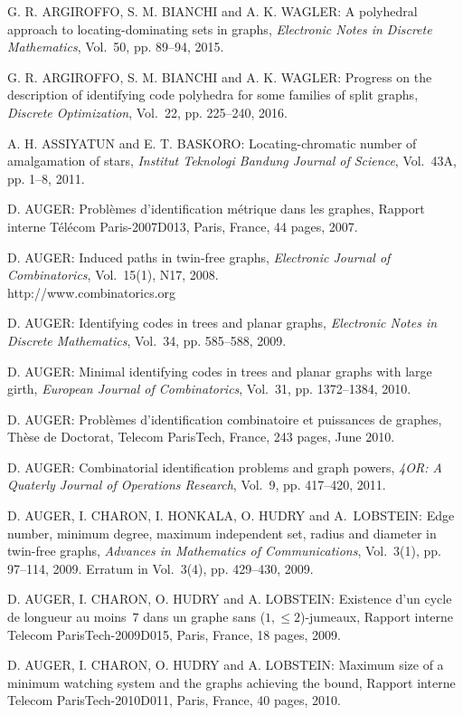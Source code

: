 \begin{thebibliography}{999}
G. R. ARGIROFFO, S. M. BIANCHI and A. K. WAGLER: A polyhedral approach to locating-dominating sets in graphs, {\it Electronic Notes in Discrete Mathematics},  Vol.~50, pp. 89--94, 2015. 

G. R. ARGIROFFO, S. M. BIANCHI and A. K. WAGLER: Progress on the description of identifying code polyhedra for some families of split graphs, {\it Discrete Optimization}, Vol.~22, pp. 225--240,  2016.

A. H. ASSIYATUN and E. T. BASKORO: Locating-chromatic number of amalgamation of stars, {\it Institut Teknologi Bandung Journal of Science}, Vol.~43A, pp. 1--8, 2011.

D. AUGER: Probl\`emes d'identification m\'etrique dans les graphes, Rapport interne T\'el\'ecom Paris-2007D013, Paris, France, 44 pages, 2007.

D. AUGER: Induced paths in twin-free graphs, {\it Electronic Journal of Combinatorics}, Vol.~15(1), N17, 2008.\\
http://www.combinatorics.org

D. AUGER: Identifying codes in trees and planar graphs, {\it Electronic Notes in Discrete Mathematics}, Vol.~34, pp. 585--588, 2009.

D. AUGER: Minimal identifying codes in trees and planar graphs with large girth, {\it European Journal of Combinatorics}, Vol.~31, pp. 1372--1384, 2010.

D. AUGER: Probl\`emes d'identification combinatoire et puissances de graphes, Th\`ese de
Doctorat, Telecom ParisTech, France, 243 pages, June 2010.

D. AUGER: Combinatorial identification problems and graph powers, {\it 4OR: A Quaterly Journal of Operations Research}, Vol.~9, pp. 417--420, 2011.

D. AUGER, I. CHARON, I. HONKALA, O. HUDRY and A.~LOBSTEIN: Edge number, minimum degree, maximum independent set, radius and diameter in twin-free graphs, {\it Advances in Mathematics of Communications}, Vol.~3(1), pp. 97--114, 2009. Erratum in Vol.~3(4), pp. 429--430, 2009.

D. AUGER, I. CHARON, O. HUDRY and A. LOBSTEIN: Existence d'un cycle de longueur au moins~$7$ dans un graphe sans ($1,\leq 2$)-jumeaux, Rapport interne Telecom ParisTech-2009D015, Paris, France, 18 pages, 2009.

D. AUGER, I. CHARON, O. HUDRY and A. LOBSTEIN: Maximum size of a minimum watching system and the graphs achieving the bound, Rapport interne Telecom ParisTech-2010D011, Paris, France, 40 pages, 2010.


\end{thebibliography}
